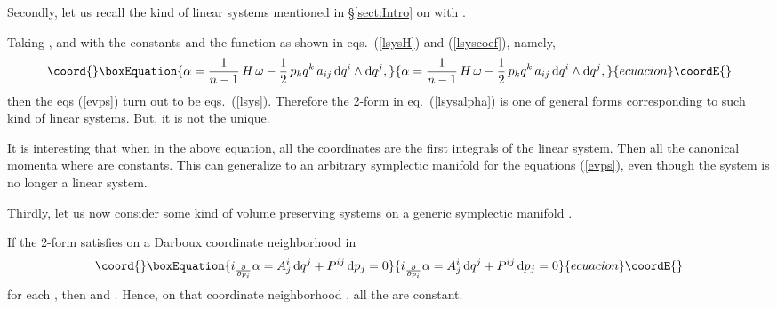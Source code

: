 \documentclass[12pt,a4paper]{article}
\providecommand{\dd}{\mathrm{d}}
\begin{document}
Secondly, let us recall the kind of linear systems mentioned in
\S\ref{sect:Intro} on \coordHE{} with \myHighlight{$\omega=\dd p_i
\wedge\dd q^i$}\coordHE{}.

Taking
  \coordHE{}, \coordHE{}
and \coordHE{}
with the constants \coordHE{} and the function \coordHE{} as shown in eqs.~(\ref{lsysH})
and (\ref{lsyscoef}), namely,
\begin{equation}\coord{}\boxEquation{
  \alpha = \frac{1}{n-1}\,H\,\omega
  - \frac{1}{2}\,p_k q^k\,a_{ij}\,
  \dd q^i\wedge\dd q^j,
\label{lsysalpha}
}{
  \alpha = \frac{1}{n-1}\,H\,\omega
  - \frac{1}{2}\,p_k q^k\,a_{ij}\,
  \dd q^i\wedge\dd q^j,
}{ecuacion}\coordE{}\end{equation}
then the eqs (\ref{evps})  turn out to be eqs.~(\ref{lsys}).
Therefore the 2-form \myHighlight{$\alpha$}\coordHE{} in eq.~(\ref{lsysalpha}) is one of
general forms corresponding to such kind of linear systems. But,
it is not the unique.


It is interesting that when \coordHE{} in the above equation, all the coordinates
\coordHE{} are the first integrals of the linear system. Then all the canonical
momenta
  \coordHE{} where \coordHE{}
are constants. This can generalize to an arbitrary symplectic
manifold for the equations (\ref{evps}), even though the system is
no longer a linear system.

Thirdly, let us now consider some kind of volume preserving
systems on a generic symplectic manifold \coordHE{}.

If the 2-form \myHighlight{$\alpha$}\coordHE{} satisfies on a Darboux coordinate
neighborhood \coordHE{} in \coordHE{}
\begin{equation}\coord{}\boxEquation{
  i_{\frac{\partial}{\partial p_i}}\alpha
  = A^i_j\,\dd q^j + P^{ij}\,\dd p_j
  = 0
}{
  i_{\frac{\partial}{\partial p_i}}\alpha
  = A^i_j\,\dd q^j + P^{ij}\,\dd p_j
  = 0
}{ecuacion}\coordE{}\end{equation}
for each \coordHE{}, then \coordHE{} and \coordHE{}. Hence, on that
coordinate neighborhood \coordHE{}, all the \coordHE{} are constant.
\end{document}
